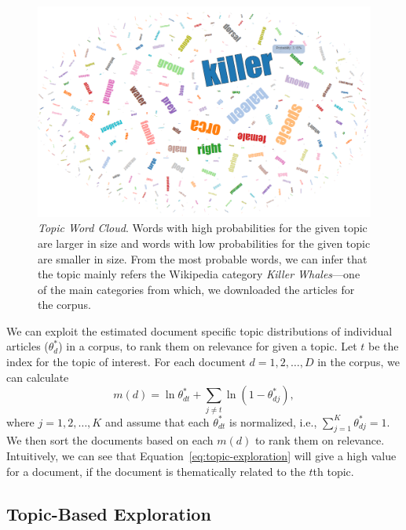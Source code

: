 \begin{figure}[htb]\centering 
\includegraphics[width=.9\textwidth]{images/topic_visualization.png}
\caption{\textsl{Topic Word Cloud}. Words with high probabilities for the 
given topic are larger in size and words with low probabilities for 
the given topic are smaller in size. From the most probable words, 
we can infer that the topic mainly refers the Wikipedia category 
\textit{Killer Whales}---one of the main categories from which, we 
downloaded the articles for the corpus.}
\label{fig:topic-word-cloud}
\end{figure}

We can exploit the estimated document specific topic distributions 
 of individual articles ($\theta_d^{*}$) in a corpus, to rank them on 
relevance for given a topic. Let $t$ be the index for the topic of 
interest. For each document $d = 1, 2, \ldots, D$ in the corpus, we 
can calculate~\cite{George2012}
\begin{equation}
m(d) = \ln \theta^*_{dt} + \sum_{j \neq t}{\ln (1 - \theta^*_{dj})},
\label{eq:topic-exploration}
\end{equation} 
where $j = 1, 2, \ldots, K$ and assume that each $\theta^*_{dt}$ is 
normalized, i.e., $\sum_{j=1}^{K}{\theta^*_{dj}} = 1$. We then sort 
the documents based on each $m(d)$ to rank them on relevance. 
Intuitively, we can see that Equation~\ref{eq:topic-exploration} 
will give a high value for a document, if the document is 
thematically related to the $t$th topic. 

\subsection{Topic-Based Exploration}

